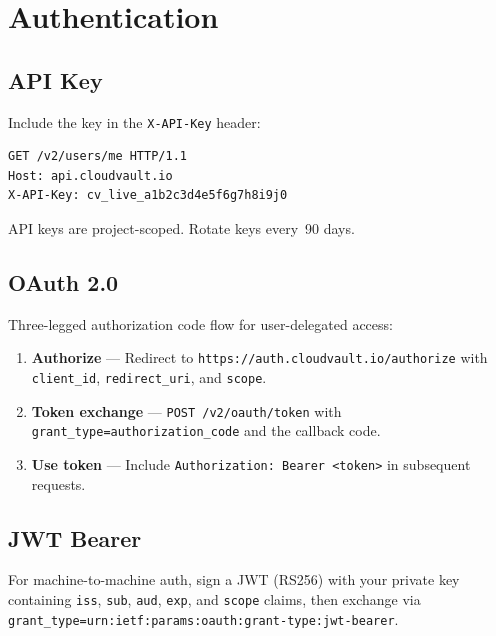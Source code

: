 \documentclass[
    language=english,
    doctype=article,
    institution=none,
]{../../omnilatex}
\begin{document}
\maketitle
\begin{abstract}
This document specifies the CloudVault REST API for programmatic access to
cloud object storage, user management, project orchestration, and task
automation.  All endpoints return JSON and accept JSON request bodies.
Base URL: \texttt{https://api.cloudvault.io/v2}.
\end{abstract}
\tableofcontents

\section{Authentication}
\label{sec:auth}

\subsection{API Key}
Include the key in the \texttt{X-API-Key} header:
\begin{verbatim}
GET /v2/users/me HTTP/1.1
Host: api.cloudvault.io
X-API-Key: cv_live_a1b2c3d4e5f6g7h8i9j0
\end{verbatim}

\begin{notebox}
API keys are project-scoped.  Rotate keys every~90 days.
\end{notebox}

\subsection{OAuth 2.0}
Three-legged authorization code flow for user-delegated access:

\begin{enumerate}[leftmargin=2em]
    \item \textbf{Authorize} --- Redirect to
        \texttt{https://auth.cloudvault.io/authorize} with
        \texttt{client\_id}, \texttt{redirect\_uri}, and \texttt{scope}.
    \item \textbf{Token exchange} --- \texttt{POST /v2/oauth/token} with
        \texttt{grant\_type=authorization\_code} and the callback code.
    \item \textbf{Use token} --- Include
        \texttt{Authorization: Bearer <token>} in subsequent requests.
\end{enumerate}

\subsection{JWT Bearer}
For machine-to-machine auth, sign a JWT (RS256) with your private key
containing \texttt{iss}, \texttt{sub}, \texttt{aud}, \texttt{exp}, and
\texttt{scope} claims, then exchange via
\texttt{grant\_type=urn:ietf:params:oauth:grant-type:jwt-bearer}.
\end{document}
